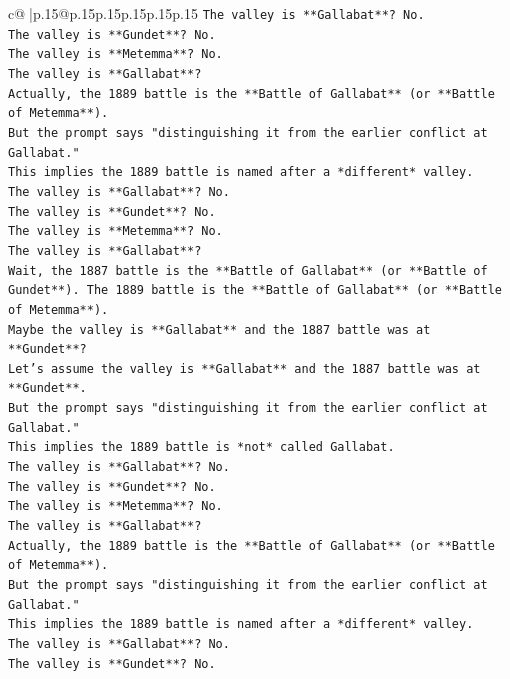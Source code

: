 \documentclass{article}
\begin{document}
{\begin{supertabular}{c@{$\;$}|p{.15\linewidth}@{}p{.15\linewidth}p{.15\linewidth}p{.15\linewidth}p{.15\linewidth}p{.15\linewidth}}
{{{\texttt{The valley is **Gallabat**? No.} \\
\texttt{The valley is **Gundet**? No.} \\
\texttt{The valley is **Metemma**? No.} \\
\texttt{The valley is **Gallabat**?} \\
\texttt{Actually, the 1889 battle is the **Battle of Gallabat** (or **Battle of Metemma**).} \\
\texttt{But the prompt says "distinguishing it from the earlier conflict at Gallabat."} \\
\texttt{This implies the 1889 battle is named after a *different* valley.} \\
\texttt{The valley is **Gallabat**? No.} \\
\texttt{The valley is **Gundet**? No.} \\
\texttt{The valley is **Metemma**? No.} \\
\texttt{The valley is **Gallabat**?} \\
\texttt{Wait, the 1887 battle is the **Battle of Gallabat** (or **Battle of Gundet**). The 1889 battle is the **Battle of Gallabat** (or **Battle of Metemma**).} \\
\texttt{Maybe the valley is **Gallabat** and the 1887 battle was at **Gundet**?} \\
\texttt{Let's assume the valley is **Gallabat** and the 1887 battle was at **Gundet**.} \\
\texttt{But the prompt says "distinguishing it from the earlier conflict at Gallabat."} \\
\texttt{This implies the 1889 battle is *not* called Gallabat.} \\
\texttt{The valley is **Gallabat**? No.} \\
\texttt{The valley is **Gundet**? No.} \\
\texttt{The valley is **Metemma**? No.} \\
\texttt{The valley is **Gallabat**?} \\
\texttt{Actually, the 1889 battle is the **Battle of Gallabat** (or **Battle of Metemma**).} \\
\texttt{But the prompt says "distinguishing it from the earlier conflict at Gallabat."} \\
\texttt{This implies the 1889 battle is named after a *different* valley.} \\
\texttt{The valley is **Gallabat**? No.} \\
\texttt{The valley is **Gundet**? No.} \\
}}}
\end{supertabular}}
\end{document}
